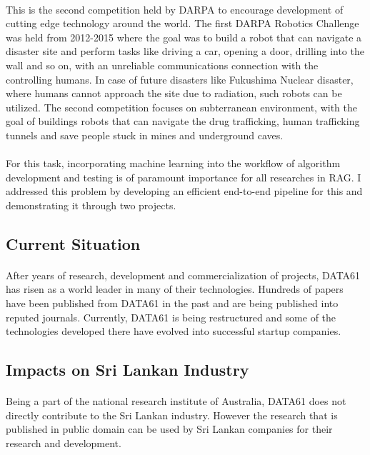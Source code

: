 \paragraph{}
This is the second competition held by DARPA to encourage development of cutting edge technology around the world. The first DARPA Robotics Challenge was held from 2012-2015 where the goal was to build a robot that can navigate a disaster site and perform tasks like driving a car, opening a door, drilling into the wall and so on, with an unreliable communications connection with the controlling humans. In case of future disasters like Fukushima Nuclear disaster, where humans cannot approach the site due to radiation, such robots can be utilized. The second competition focuses on subterranean environment, with the goal of buildings robots that can navigate the drug trafficking, human trafficking tunnels and save people stuck in mines and underground caves.

\paragraph{}
For this task, incorporating machine learning into the workflow of algorithm development and testing is of paramount importance for all researches in RAG. I addressed this problem by developing an efficient end-to-end pipeline for this and demonstrating it through two projects.


\subsection{Current Situation}
\paragraph{}
After years of research, development and commercialization of projects, DATA61 has risen as a world leader in many of their technologies. Hundreds of papers have been published from DATA61 in the past and are being published into reputed journals. Currently, DATA61 is being restructured and some of the technologies developed there have evolved into successful startup companies.

\subsection{Impacts on Sri Lankan Industry}
\paragraph{}
Being a part of the national research institute of Australia, DATA61 does not directly contribute to the Sri Lankan industry. However the research that is published in public domain can be used by Sri Lankan companies for their research and development.

